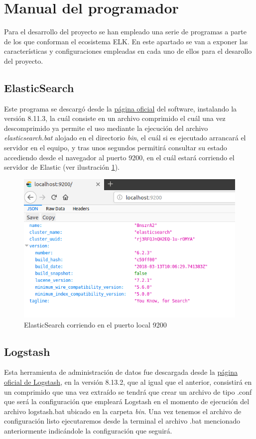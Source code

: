 \section{Manual del programador}
Para el desarrollo del proyecto se han empleado una serie de programas a parte de los que conforman el ecosistema ELK. En este apartado se van a exponer las características y configuraciones empleadas en cada uno de ellos para el desarollo del proyecto.

\subsection{ElasticSearch}
Este programa se descargó desde la \href{https://www.elastic.co/es/elasticsearch}{página oficial} del software, instalando la versión 8.11.3, la cuál consiste en un archivo comprimido el cuál una vez descomprimido ya permite el uso mediante la ejecución del archivo \textit{elasticsearch.bat} alojado en el directorio \textit{bin}, el cuál si es ejecutado arrancará el servidor en el equipo, y tras unos segundos permitirá consultar su estado accediendo desde el navegador al puerto 9200, en el cuál estará corriendo el servidor de Elastic  (ver ilustración  \ref{fig:elastic9200}).

\begin{figure}
    \centering
    \includegraphics[width=1\linewidth]{img/elastic.png}
    \caption{ElasticSearch corriendo en el puerto local 9200}
    \label{fig:elastic9200}
\end{figure}

\subsection{Logstash}
Esta herramienta de administración de datos fue descargada desde la \href{https://www.elastic.co/es/logstash}{página oficial de Logstash}, en la versión 8.13.2, que al igual que el anterior, consistirá en un comprimido que una vez extraído se tendrá que crear un archivo de tipo .conf que será la configuración que empleará Logstash en el momento de ejecución del archivo logstash.bat ubicado en la carpeta \textit{bin}. Una vez tenemos el archivo de configuración listo ejecutaremos desde la terminal el archivo .bat mencionado anteriormente indicándole la configuración que seguirá.

